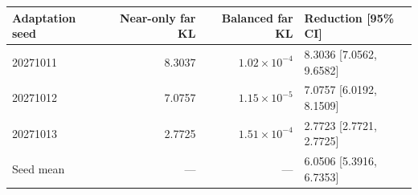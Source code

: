 \begin{tabular}{lrrl}
\toprule
Adaptation seed & Near-only far KL & Balanced far KL & Reduction [95\% CI] \\
\midrule
20271011 & 8.3037 & $1.02\times10^{-4}$ & 8.3036 [7.0562, 9.6582] \\
20271012 & 7.0757 & $1.15\times10^{-5}$ & 7.0757 [6.0192, 8.1509] \\
20271013 & 2.7725 & $1.51\times10^{-4}$ & 2.7723 [2.7721, 2.7725] \\
\midrule
Seed mean & --- & --- & 6.0506 [5.3916, 6.7353] \\
\bottomrule
\end{tabular}
